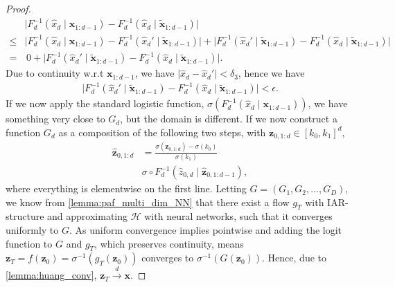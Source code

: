\begin{proof}
    \begin{align*}
        &\lvert F_d^{-1}(\hat{x}_d \mid \bm x_{1:d-1}) - F_d^{-1}(\hat{x}_d \mid \tilde{\bm x}_{1:d-1})\rvert\\
        \leq & \lvert F_d^{-1}(\hat{x}_d \mid \bm x_{1:d-1}) - F_d^{-1}(\hat{x}_d' \mid \tilde{\bm x}_{1:d-1})\rvert
        + \lvert F_d^{-1}(\hat{x}_d' \mid \tilde{\bm x}_{1:d-1}) - F_d^{-1}(\hat{x}_d \mid \tilde{\bm x}_{1:d-1})\rvert\\
        =& \, 0 + \lvert F_d^{-1}(\hat{x}_d' \mid \tilde{\bm x}_{1:d-1}) - F_d^{-1}(\hat{x}_d \mid 
        \tilde{\bm x}_{1:d-1})\rvert.
    \end{align*}
    Due to continuity w.r.t \(\bm x_{1:d-1}\), we have  \(\lvert \hat{x}_d - \hat{x}_d'\rvert < \delta_3\), hence we
    have 
    \begin{align*}
        \lvert F_d^{-1}(\hat{x}_d' \mid \tilde{\bm x}_{1:d-1}) - F_d^{-1}(\hat{x}_d \mid 
        \tilde{\bm x}_{1:d-1})\rvert < \epsilon.
    \end{align*}
    If we now apply the standard logistic function, \(\sigma(F_d^{-1}(\hat{x}_d \mid \bm x_{1:d-1}))\), 
    we have something
    very close to \(G_d\), but the domain is different. If we now construct a function \(G_d\) as a composition 
    of the following two steps,
    with \(\bm z_{0,1:d} \in [k_0, k_1]^{d}\),
    \begin{align*}
        \hat{\bm z}_{0,1:d} &= \frac{\sigma(\bm z_{0,1:d}) - \sigma(k_0)}{\sigma(k_1)}\\
                            &\sigma\circ F^{-1}_d(\hat{z}_{0,d} \mid \hat{\bm z}_{0,1:d-1}),
    \end{align*}
    where everything is elementwise on the first line.
    Letting \(G= (G_1,G_2, \dots, G_D)\), we know from \cref{lemma:paf_multi_dim_NN} that there exist 
    a flow \(g_T\) with IAR-structure and approximating \(\mathcal{H}\) with neural networks, 
    such that it converges uniformly to \(G\). As uniform convergence implies pointwise and adding
    the logit function to \(G\) and \(g_T\), which preserves continuity, means 
    \(\bm z_T = f(\bm z_0) = \sigma^{-1}(g_T(\bm z_0))\) converges to \(\sigma^{-1}(G(\bm z_0))\). Hence,
    due to \cref{lemma:huang_conv}, \(\bm z_T \xrightarrow{d} \bm x\).
\end{proof}

